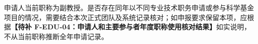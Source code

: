 \justifying
\NSFCBodyText

申请人当前职称为副教授。是否存在同年以不同专业技术职务申请或参与科学基金项目的情况，需要结合本次正式团队及系统记录核对；如申报要求保留本项，应根据\textbf{【待补 F-EDU-04：申请人和主要参与者年度职称使用核对结果】}如实说明，不从当前职称推断全年申请记录。
